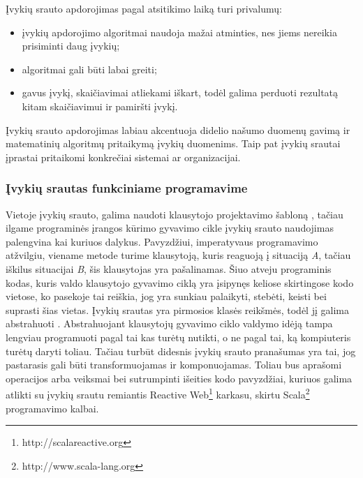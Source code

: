 Įvykių srauto apdorojimas pagal atsitikimo laiką turi privalumų:

\begin{itemize}

	\item įvykių apdorojimo algoritmai naudoja mažai atminties, nes jiems nereikia prisiminti daug įvykių;

	\item algoritmai gali būti labai greiti;

	\item gavus įvykį, skaičiavimai atliekami iškart, todėl galima perduoti rezultatą kitam skaičiavimui ir pamiršti įvykį.

\end{itemize}

Įvykių srauto apdorojimas labiau akcentuoja didelio našumo duomenų gavimą ir matematinių algoritmų pritaikymą įvykių duomenims. Taip pat įvykių srautai įprastai pritaikomi konkrečiai sistemai ar organizacijai.

\subsubsection{Įvykių srautas funkciniame programavime}

Vietoje įvykių srauto, galima naudoti klausytojo projektavimo šabloną \cite{WhiteboardPattern}, tačiau ilgame programinės įrangos kūrimo gyvavimo cikle įvykių srauto naudojimas palengvina kai kuriuos dalykus. Pavyzdžiui, imperatyvaus programavimo atžvilgiu, viename metode turime klausytoją, kuris reaguoją į situaciją \textit{A}, tačiau iškilus situacijai \textit{B}, šis klausytojas yra pašalinamas. Šiuo atveju programinis kodas, kuris valdo klausytojo gyvavimo ciklą yra įsipynęs keliose skirtingose kodo vietose, ko pasekoje tai reiškia, jog yra sunkiau palaikyti, stebėti, keisti bei suprasti šias vietas. Įvykių srautas yra pirmosios klasės reikšmės, todėl jį galima abstrahuoti \cite{EPFL-REPORT-176887}. Abstrahuojant klausytojų gyvavimo ciklo valdymo idėją tampa lengviau programuoti pagal tai kas turėtų nutikti, o ne pagal tai, ką kompiuteris turėtų daryti toliau. Tačiau turbūt didesnis įvykių srauto pranašumas yra tai, jog pastarasis gali būti transformuojamas ir komponuojamas. Toliau bus aprašomi operacijos arba veiksmai bei sutrumpinti išeities kodo pavyzdžiai, kuriuos galima atlikti su įvykių srautu remiantis Reactive Web\footnote{http://scalareactive.org} karkasu, skirtu Scala\footnote{http://www.scala-lang.org} programavimo kalbai.


